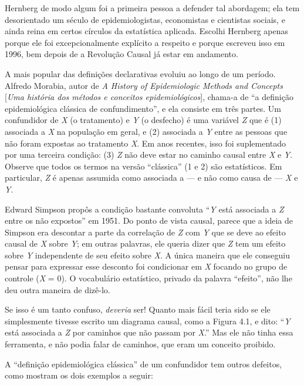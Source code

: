 \documentclass[11pt,a5paper,twoside]{book}
\begin{document}
Hernberg de modo algum foi a primeira pessoa a defender tal abordagem; ela tem desorientado um século de epidemiologistas, economistas e cientistas sociais, e ainda reina em certos círculos da estatística aplicada. Escolhi Hernberg apenas porque ele foi excepcionalmente explícito a respeito e porque escreveu isso em 1996, bem depois de a Revolução Causal já estar em andamento.

A mais popular das definições declarativas evoluiu ao longo de um período. Alfredo Morabia, autor de \textit{A History of Epidemiologic Methods and Concepts} [\textit{Uma história dos métodos e conceitos epidemiológicos}], chama-a de “a definição epidemiológica clássica de confundimento”, e ela consiste em três partes. Um confundidor de \textit{X} (o tratamento) e \textit{Y} (o desfecho) é uma variável \textit{Z} que é (1) associada a \textit{X} na população em geral, e (2) associada a \textit{Y} entre as pessoas que não foram expostas ao tratamento \textit{X}. Em anos recentes, isso foi suplementado por uma terceira condição: (3) \textit{Z} não deve estar no caminho causal entre \textit{X} e \textit{Y}. Observe que todos os termos na versão “clássica” (1 e 2) são estatísticos. Em particular, \textit{Z} é apenas assumida como associada a — e não como causa de — \textit{X} e \textit{Y}.

Edward Simpson propôs a condição bastante convoluta “\textit{Y} está associada a \textit{Z} entre os não expostos” em 1951. Do ponto de vista causal, parece que a ideia de Simpson era descontar a parte da correlação de \textit{Z} com \textit{Y} que se deve ao efeito causal de \textit{X} sobre \textit{Y}; em outras palavras, ele queria dizer que \textit{Z} tem um efeito sobre \textit{Y} independente de seu efeito sobre \textit{X}. A única maneira que ele conseguiu pensar para expressar esse desconto foi condicionar em \textit{X} focando no grupo de controle (\textit{X} = 0). O vocabulário estatístico, privado da palavra “efeito”, não lhe deu outra maneira de dizê-lo.

Se isso é um tanto confuso, \textit{deveria} ser! Quanto mais fácil teria sido se ele simplesmente tivesse escrito um diagrama causal, como a Figura 4.1, e dito: “\textit{Y} está associada a \textit{Z} por caminhos que não passam por \textit{X}.” Mas ele não tinha essa ferramenta, e não podia falar de caminhos, que eram um conceito proibido.

A “definição epidemiológica clássica” de um confundidor tem outros defeitos, como mostram os dois exemplos a seguir:
\end{document}
